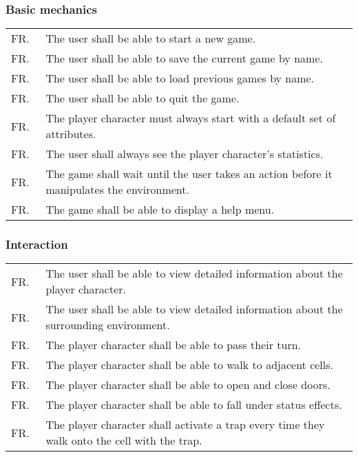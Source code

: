 \documentclass[12pt, titlepage]{article}
\newcounter{FRCounter}
\newcommand{\freq}[1]{
	\hfill\stepcounter{FRCounter}FR.\textbf{\theFRCounter}
	& #1
}
\begin{document}
		\subsubsection{Basic mechanics}
			\begin{tabular}{p{0.1\linewidth}p{0.9\linewidth}}
				\freq{The user shall be able to start a new game.}\\
				\freq{The user shall be able to save the current game by name.}\\
				\freq{The user shall be able to load previous games by name.}\\
				\freq{The user shall be able to quit the game.}\\
				\freq{The player character must always start with a default set of attributes.}\\
				\freq{The user shall always see the player character's statistics.}\\
				\freq{The game shall wait until the user takes an action before it manipulates the environment.}\\
				\freq{The game shall be able to display a help menu.}\\
			\end{tabular}

		\subsubsection{Interaction}
			\begin{tabular}{p{0.1\linewidth}p{0.9\linewidth}}
				\freq{The user shall be able to view detailed information about the player character.}\\
				\freq{The user shall be able to view detailed information about the surrounding environment.}\\
				\freq{The player character shall be able to pass their turn.}\\
				\freq{The player character shall be able to walk to adjacent cells.}\\
				\freq{The player character shall be able to open and close doors.}\\
				\freq{The player character shall be able to fall under status effects.}\\
				\freq{The player character shall activate a trap every time they walk onto the cell with the trap.}\\
			\end{tabular}
\end{document}
